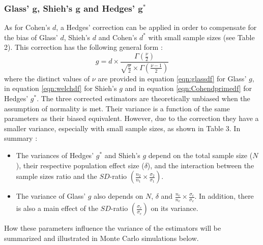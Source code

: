 \documentclass[
  english,
  man,floatsintext]{apa6}
\providecommand{\tightlist}{%
  \setlength{\itemsep}{0pt}\setlength{\parskip}{0pt}}
\begin{document}
\hypertarget{glass-bmg-shiehs-bmg-and-hedges-bmg}{%
\subsubsection{\texorpdfstring{Glass' \(\bm{g}\), Shieh's \(\bm{g}\) and Hedges' \(\bm{g^*}\)}{Glass' \textbackslash bm\{g\}, Shieh's \textbackslash bm\{g\} and Hedges' \textbackslash bm\{g\^{}*\}}}\label{glass-bmg-shiehs-bmg-and-hedges-bmg}}

As for Cohen's \(d\), a Hedges' correction can be applied in order to compensate for the bias of Glass' \(d\), Shieh's \(d\) and Cohen's \(d^*\) with small sample sizes (see Table 2). This correction has the following general form :
\begin{equation*} 
g = d \times \frac{\Gamma(\frac{\nu}{2})}{\sqrt{\frac{\nu}{2}} \times \Gamma(\frac{\nu-1}{2})}
\end{equation*}
where the distinct values of \(\nu\) are provided in equation \ref{eqn:glassdf} for Glass' \(g\), in equation \ref{eqn:welchdf} for Shieh's \(g\) and in equation \ref{eqn:Cohendprimedf} for Hedges' \(g^*\). The three corrected estimators are theoretically unbiased when the assumption of normality is met. Their variance is a function of the same parameters as their biased equivalent. However, due to the correction they have a smaller variance, especially with small sample sizes, as shown in Table 3. In summary :

\begin{itemize}
\tightlist
\item
  The variances of Hedges' \(g^*\) and Shieh's \(g\) depend on the total sample size (\(N\)), their respective population effect size (\(\delta\)), and the interaction between the sample sizes ratio and the \(SD\)-ratio \(\left(\frac{n_2}{n_1}\times\frac{\sigma_2}{\sigma_1} \right)\).\\
\item
  The variance of Glass' \(g\) also depends on \(N\), \(\delta\) and \(\frac{n_c}{n_e}\times\frac{\sigma_c}{\sigma_e}\). In addition, there is also a main effect of the \(SD\)-ratio \(\left(\frac{\sigma_c}{\sigma_e} \right)\) on its variance.
\end{itemize}

How these parameters influence the variance of the estimators will be summarized and illustrated in Monte Carlo simulations below.
\end{document}
